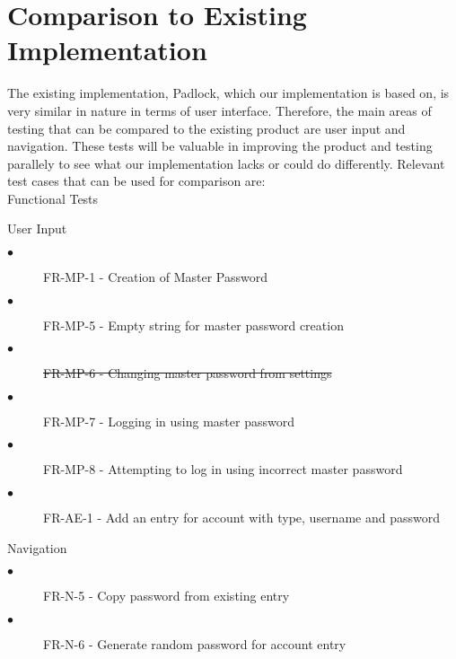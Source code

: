 \documentclass[12pt, titlepage]{article}
\begin{document}
\section{Comparison to Existing Implementation}	
				
The existing implementation, Padlock, which our implementation is based on, is very similar in nature in terms of user interface. Therefore, the main areas of testing that can be compared to the existing product are user input and navigation. These tests will be valuable in improving the product and testing parallely to see what our implementation lacks or could do differently. Relevant test cases that can be used for comparison are:\\

Functional Tests
\begin{description} 
    \item User Input
    \begin{description}
        \item[$\bullet$] FR-MP-1 - Creation of Master Password
        \item[$\bullet$] FR-MP-5 - Empty string for master password creation
        \item[$\bullet$] \sout{FR-MP-6 - Changing master password from settings}
        \item[$\bullet$] FR-MP-7 - Logging in using master password
        \item[$\bullet$] FR-MP-8 - Attempting to log in using incorrect master password
        \item[$\bullet$] FR-AE-1 - Add an entry for account with type, username and password
    \end{description}
    \item Navigation
    \begin{description}
        \item[$\bullet$] FR-N-5 - Copy password from existing entry
        \item[$\bullet$] FR-N-6 - Generate random password for account entry
    \end{description}
\end{description}
\end{document}
